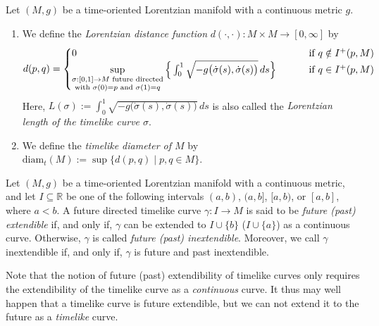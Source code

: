 \documentclass[reqno]{article}
\newcommand{\R}{\mathbb{R}}
\newcommand{\diam}{\mathrm{diam}}
\begin{document}
\begin{definition}\label{schwdef:lorentzian_distance_function}
Let $(M,g)$ be a time-oriented Lorentzian manifold with a continuous metric $g$. 
\begin{enumerate}
\item We define the \emph{Lorentzian distance function} $d(\cdot, \cdot) : M \times M \to [0,\infty]$ by
\begin{equation*}
d(p,q) = \begin{cases} 0 &\textnormal{ if } q \notin I^+(p,M) \\ \sup\limits_{\substack{\sigma : [0,1] \to M \textnormal{ future directed} \\ \textnormal{with } \sigma(0) = p \textnormal{ and } \sigma(1) =q}} \Big{\{} \int_0^1 \sqrt{-g\big(\dot{\sigma}(s), \dot{\sigma}(s)\big)} \, ds \Big{\}} \qquad &\textnormal{ if } q \in I^+(p,M) \end{cases}
\end{equation*}
Here, $L(\sigma) := \int_0^1 \sqrt{-g\big(\dot{\sigma}(s), \dot{\sigma}(s)\big)} \, ds$ is also called the \emph{Lorentzian length of the timelike curve $\sigma$}.
\item We define the \emph{timelike diameter of $M$} by $\diam_t(M) := \sup\{d(p,q)\;|\; p,q \in M\}$.
\end{enumerate}
\end{definition}

\begin{definition}\label{schwdef:future_past_extendible}
Let $(M,g)$ be a time-oriented Lorentzian manifold with a continuous metric, and let $I \subseteq \R$ be one of the following intervals $(a,b)$, $(a,b]$, $[a,b)$, or $[a,b]$, where $a <b$.  A future directed timelike curve $\gamma : I \to M$ is said to be \emph{future (past) extendible} if, and only if, $\gamma$ can be extended to $I \cup \{b\}$ ($I \cup \{a\}$) as a continuous curve. Otherwise, $\gamma$ is called \emph{future (past) inextendible}. Moreover, we call $\gamma$ inextendible if, and only if, $\gamma$ is future and past inextendible.
\end{definition}

\begin{remark}\label{schwrem:note_notion_future_past}
Note that the notion of future (past) extendibility of timelike curves only requires the extendibility of the timelike curve as a \emph{continuous} curve. It thus may well happen that a timelike curve is future extendible, but we can not extend it to the future as a \emph{timelike} curve.
\end{remark}
\end{document}
